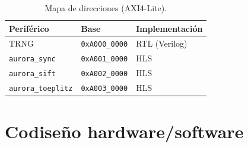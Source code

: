 \documentclass[a4paper,11pt]{article}
\newcommand{\code}[1]{\texttt{#1}}
\begin{document}
\begin{table}[htbp]
\centering
\caption{Mapa de direcciones (AXI4-Lite).}
\begin{tabular}{lll}
\toprule
Periférico & Base & Implementación \\
\midrule
TRNG & \code{0xA000\_0000} & RTL (Verilog) \\
\code{aurora\_sync} & \code{0xA001\_0000} & HLS \\
\code{aurora\_sift} & \code{0xA002\_0000} & HLS \\
\code{aurora\_toeplitz} & \code{0xA003\_0000} & HLS \\
\bottomrule
\end{tabular}
\end{table}

\section{Codiseño hardware/software}
\end{document}

